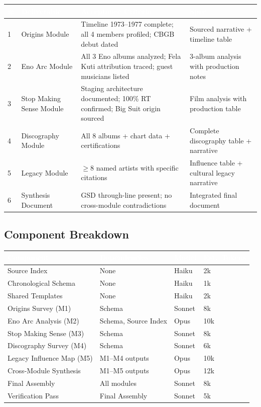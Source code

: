 \documentclass[11pt,letterpaper]{article}
\newcommand{\tableheader}[1]{\textbf{\sffamily\textcolor{white}{#1}}}
\begin{document}
\begin{center}
\begin{tabularx}{\textwidth}{C{0.5cm}L{3.5cm}L{4cm}X}
\toprule
{}
\tableheader{\#} & \tableheader{Deliverable} & \tableheader{Acceptance Criteria} & \tableheader{Spec} \\
 & Origins Module & Timeline 1973--1977 complete; all 4 members profiled; CBGB debut dated & Sourced narrative + timeline table \\
2 & Eno Arc Module & All 3 Eno albums analyzed; Fela Kuti attribution traced; guest musicians listed & 3-album analysis with production notes \\
3 & Stop Making Sense Module & Staging architecture documented; 100\% RT confirmed; Big Suit origin sourced & Film analysis with production table \\
4 & Discography Module & All 8 albums + chart data + certifications & Complete discography table + narrative \\
5 & Legacy Module & $\ge$8 named artists with specific citations & Influence table + cultural legacy narrative \\
6 & Synthesis Document & GSD through-line present; no cross-module contradictions & Integrated final document \\
\bottomrule
\end{tabularx}
\end{center}

\subsection{Component Breakdown}

\begin{center}
\begin{tabularx}{\textwidth}{L{3.5cm}L{2.5cm}C{1.5cm}C{2cm}}
\toprule
{}
\tableheader{Component} & \tableheader{Dependencies} & \tableheader{Model} & \tableheader{Est.\ Tokens} \\
\midrule
Source Index & None & Haiku & 2k \\
Chronological Schema & None & Haiku & 1k \\
Shared Templates & None & Haiku & 2k \\
Origins Survey (M1) & Schema & Sonnet & 8k \\
Eno Arc Analysis (M2) & Schema, Source Index & Opus & 10k \\
Stop Making Sense (M3) & Schema & Sonnet & 8k \\
Discography Survey (M4) & Schema & Sonnet & 6k \\
Legacy Influence Map (M5) & M1--M4 outputs & Opus & 10k \\
Cross-Module Synthesis & M1--M5 outputs & Opus & 12k \\
Final Assembly & All modules & Sonnet & 8k \\
Verification Pass & Final Assembly & Sonnet & 5k \\
\bottomrule
\end{tabularx}
\end{center}
\end{document}
